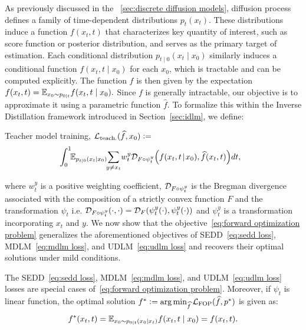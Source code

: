     As previously discussed in the \wasyparagraph~\ref{sec:discrete diffusion models}, diffusion process defines a family of time-dependent distributions $p_t(x_t)$. These distributions induce a function $f(x_t, t)$ that characterizes key quantity of interest, such as score function or posterior distribution, and serves as the primary target of estimation. Each conditional distribution $p_{t \mid 0}(x_t \mid x_0)$ similarly induces a conditional function $f(x_t, t \mid x_0)$ for each $x_0$, which is tractable and can be computed explicitly. The function $f$ is then given by the expectation $f(x_t, t) = \mathbb{E}_{x_0 \sim p_{0 \mid t}} f(x_t, t \mid x_0).$ Since $f$ is generally intractable, our objective is to approximate it using a parametric function $\widehat{f}$. To formalize this within the Inverse Distillation framework introduced in Section~\ref{sec:idlm}, we define:
    \begin{Box1}{Teacher model training, $\mathcal{L}_{\text{teach.}}(\widehat{f}, x_0) \vcentcolon=$}
    \vspace{-8pt}
    \begin{align}
      \label{eq:forward optimization problem}
      \!\!\!\! \int_0^1 \!\! \EE_{p_{t|0}(x_t|x_0)} \!\! \sum_{y \neq x_t}\!  w_t^y 
      \DC_{F\circ\psi_t^y}\!\left(f(x_t, t \!\mid\! x_0), \widehat{f}(x_t, t)\right) \!dt,
    \end{align}
    \end{Box1}
    where $w_t^y$ is a positive weighting coefficient, $\mathcal{D}_{F\circ\psi_t^y}$ is the Bregman divergence associated
with the composition of a strictly convex function $F$ and the transformation $\psi_t$ i.e. $\mathcal{D}_{F\circ\psi_t^y}(\cdot,\cdot) = \mathcal{D}_{F}(\psi_t^y(\cdot), \psi_t^y(\cdot))$ and $\psi_t^y$ is a transformation incorporating $x_t$ and $y$.
    We now show that the objective~\eqref{eq:forward optimization problem} generalizes the aforementioned objectives of SEDD~\eqref{eq:sedd loss}, MDLM~\eqref{eq:mdlm loss}, and UDLM~\eqref{eq:udlm loss} and recovers their optimal solutions under mild conditions.
    \begin{proposition}
    \label{prop:optimum of universal loss}
    The SEDD~\eqref{eq:sedd loss}, MDLM~\eqref{eq:mdlm loss}, and UDLM~\eqref{eq:udlm loss} losses are special cases of~\eqref{eq:forward optimization problem}. Moreover, if $\psi_t$ is linear function, the optimal solution $f^* \vcentcolon= \arg\min_{\widehat{f}} \mathcal{L}_{\text{FOP}}(\widehat{f}, p^*)$ is given as:
    \begin{gather}
      f^*(x_t, t) = \mathbb{E}_{x_0 \sim p_{0\mid t}(x_0 \mid x_t)} f(x_t, t \mid x_0) = f(x_t, t). \nonumber
    \end{gather}
    \end{proposition}
